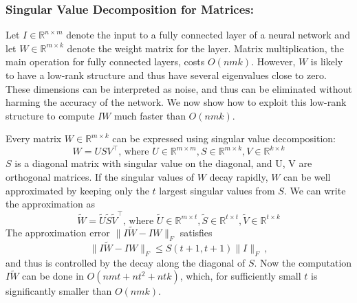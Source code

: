 \vspace{-0.3cm}
\subsubsection{Singular Value Decomposition for Matrices:}\label{subsubsec:svd}
Let $I \in \mathbb{R}^{n \times m}$ denote the input to a fully connected layer of a neural network and let $W \in \mathbb{R}^{m \times k}$ denote the weight matrix for the layer. Matrix multiplication,  the main operation for fully connected layers, costs $O(nmk)$. However, $W$ is likely to have a low-rank structure and thus have several eigenvalues close to zero. These dimensions can be interpreted as noise, and thus can be eliminated without harming the accuracy of the network. We now show how to exploit this low-rank structure to compute $IW$ much faster than $O(nmk)$. 


Every matrix $W \in \mathbb{R}^{m \times k}$ can be expressed using singular value decomposition:
\begin{equation*}
	W = USV^{\top}\text{, where }U \in \mathbb{R}^{m \times m}, S \in \mathbb{R}^{m \times k}, V \in \mathbb{R}^{k \times k}
\end{equation*}
$S$ is a diagonal matrix with  singular value on the diagonal, and U, V are orthogonal matrices. If the singular values of $W$ decay rapidly, $W$ can be well approximated by keeping only the $t$ largest singular values from $S$. We can write the approximation as
\begin{equation}
\label{svdapprox}
	\tilde{W} = \tilde{U}\tilde{S}\tilde{V}^{\top}\text{, where }\tilde{U} \in \mathbb{R}^{m \times t}, \tilde{S} \in \mathbb{R}^{t \times t}, \tilde{V} \in \mathbb{R}^{t \times k}
\end{equation}
The approximation error $\| I \tilde{W} - I W \|_F$ satisfies 
\begin{equation}
\label{svdapproxerr}
\| I \tilde{W} - I W \|_F \leq S(t+1,t+1) \| I \|_F~,
\end{equation}
and thus is controlled by the decay along the diagonal of $S$.
Now the computation $I\tilde{W}$ can be done in $O(nmt + nt^2 + ntk)$, which, for sufficiently small $t$ is significantly smaller than $O(nmk)$. 

\vspace{-0.3cm}
